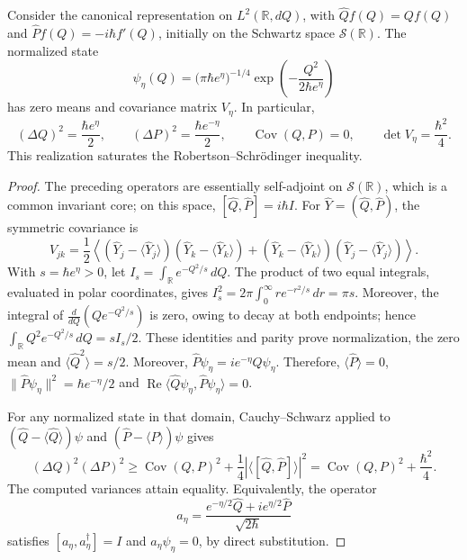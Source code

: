 \begin{proposition}
\label{x_reciprocidad:prop:ii-covarianza-gaussiana}
Consider the canonical representation on \(L^2(\mathbb R,dQ)\), with
\(\widehat Qf(Q)=Qf(Q)\) and
\(\widehat Pf(Q)=-i\hbar f'(Q)\), initially on the Schwartz
space \(\mathcal S(\mathbb R)\). The normalized state
\begin{equation}
 \psi_\eta(Q)=\bigl(\pi\hbar e^\eta\bigr)^{-1/4}
 \exp\!\left(-\frac{Q^2}{2\hbar e^\eta}\right)
 \label{x_reciprocidad:eq:ii-gaussiana-accion}
\end{equation}
has zero means and covariance matrix \(V_\eta\). In particular,
\begin{equation}
 (\Delta Q)^2=\frac{\hbar e^\eta}{2},\qquad
 (\Delta P)^2=\frac{\hbar e^{-\eta}}{2},\qquad
 \operatorname{Cov}(Q,P)=0,\qquad
 \det V_\eta=\frac{\hbar^2}{4}.
 \label{x_reciprocidad:eq:ii-varianzas-accion}
\end{equation}
This realization saturates the Robertson--Schrödinger inequality.
\end{proposition}

\begin{proof}
The preceding operators are essentially self-adjoint on
\(\mathcal S(\mathbb R)\), which is a common invariant core;
on this space,
\([\widehat Q,\widehat P]=i\hbar I\). For
\(\widehat Y=(\widehat Q,\widehat P)\), the symmetric covariance is
\[
 V_{jk}=\frac12\left\langle
 (\widehat Y_j-\langle\widehat Y_j\rangle)
 (\widehat Y_k-\langle\widehat Y_k\rangle)
 +(\widehat Y_k-\langle\widehat Y_k\rangle)
 (\widehat Y_j-\langle\widehat Y_j\rangle)
 \right\rangle.
\]
With \(s=\hbar e^\eta>0\), let \(I_s=\int_{\mathbb R}e^{-Q^2/s}\,dQ\). The product of two equal integrals, evaluated in polar coordinates, gives \(I_s^2=2\pi\int_0^\infty r e^{-r^2/s}\,dr=\pi s\). Moreover, the integral of \(\frac{d}{dQ}(Qe^{-Q^2/s})\) is zero, owing to decay at both endpoints; hence \(\int_{\mathbb R}Q^2e^{-Q^2/s}\,dQ=sI_s/2\). These identities and parity prove normalization, the zero mean and \(\langle\widehat Q^2\rangle=s/2\). Moreover, \(\widehat P\psi_\eta=i e^{-\eta}Q\psi_\eta\). Therefore, \(\langle\widehat P\rangle=0\), \(\|\widehat P\psi_\eta\|^2=\hbar e^{-\eta}/2\) and \(\operatorname{Re}\langle\widehat Q\psi_\eta,
\widehat P\psi_\eta\rangle=0\).

For any normalized state in that domain, Cauchy--Schwarz applied
to \((\widehat Q-\langle\widehat Q\rangle)\psi\) and
\((\widehat P-\langle\widehat P\rangle)\psi\) gives
\[
 (\Delta Q)^2(\Delta P)^2
 \geq \operatorname{Cov}(Q,P)^2
       +\frac14\left|\langle[\widehat Q,\widehat P]\rangle\right|^2
 =\operatorname{Cov}(Q,P)^2+\frac{\hbar^2}{4}.
\]
The computed variances attain equality. Equivalently, the
operator
\[
 a_\eta=\frac{e^{-\eta/2}\widehat Q
                  +i e^{\eta/2}\widehat P}{\sqrt{2\hbar}}
\]
satisfies \([a_\eta,a_\eta^\dagger]=I\) and
\(a_\eta\psi_\eta=0\), by direct substitution.
\end{proof}

